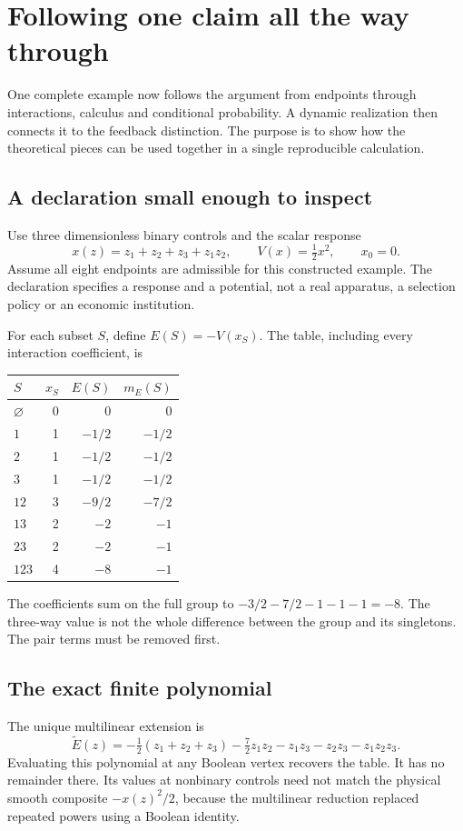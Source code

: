 \chapter{Following one claim all the way through}\label{app:worked-review}

One complete example now follows the argument from endpoints through interactions, calculus and conditional probability. A dynamic realization then connects it to the feedback distinction. The purpose is to show how the theoretical pieces can be used together in a single reproducible calculation.


\section{A declaration small enough to inspect}
Use three dimensionless binary controls and the scalar response
\begin{equation}
 x(z)=z_1+z_2+z_3+z_1z_2,
 \qquad V(x)=\tfrac12x^2,
 \qquad x_0=0.
\end{equation}
Assume all eight endpoints are admissible for this constructed example. The declaration specifies a response and a potential, not a real apparatus, a selection policy or an economic institution.

For each subset $S$, define $E(S)=-V(x_S)$. The table, including every interaction coefficient, is
\begin{center}
\begin{tabular}{lrrr}\toprule
$S$ & $x_S$ & $E(S)$ & $m_E(S)$\\\midrule
$\varnothing$ & 0 & 0 & 0\\
$1$ & 1 & $-1/2$ & $-1/2$\\
$2$ & 1 & $-1/2$ & $-1/2$\\
$3$ & 1 & $-1/2$ & $-1/2$\\
$12$ & 3 & $-9/2$ & $-7/2$\\
$13$ & 2 & $-2$ & $-1$\\
$23$ & 2 & $-2$ & $-1$\\
$123$ & 4 & $-8$ & $-1$\\\bottomrule
\end{tabular}
\end{center}
The coefficients sum on the full group to $-3/2-7/2-1-1-1=-8$. The three-way value is not the whole difference between the group and its singletons. The pair terms must be removed first.

\section{The exact finite polynomial}
The unique multilinear extension is
\begin{equation}
 \widetilde E(z)=-\tfrac12(z_1+z_2+z_3)
 -\tfrac72z_1z_2-z_1z_3-z_2z_3-z_1z_2z_3.
\end{equation}
Evaluating this polynomial at any Boolean vertex recovers the table. It has no remainder there. Its values at nonbinary controls need not match the physical smooth composite $-x(z)^2/2$, because the multilinear reduction replaced repeated powers using a Boolean identity.

